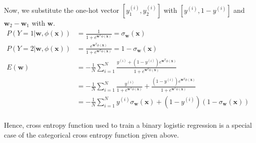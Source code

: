 \documentclass[12pt, fleqn]{article}
\begin{document}
Now, we substitute the one-hot vector $[y_1^{(i)}, y_2^{(i)}]$ with $[y^{(i)}, 1 - y^{(i)}]$ and $\mathbf{w}_2 - \mathbf{w}_1$ with $\mathbf{w}$.
\begin{equation*}
  \begin{aligned}
    P(Y = 1| \mathbf{w}, \phi(\mathbf{x})) & = \frac{1}{1 + e^{\mathbf{w}^T \phi(\mathbf{x})}} = \sigma_\mathbf{w} (\mathbf{x})                                                                                                 \\
    P(Y = 2| \mathbf{w}, \phi(\mathbf{x})) & = \frac{e^{\mathbf{w}^T \phi(\mathbf{x})}}{1 + e^{\mathbf{w}^T \phi(\mathbf{x})}} = 1 - \sigma_\mathbf{w} (\mathbf{x})                                                             \\
    E(\mathbf{w})                          & = - \frac{1}{N} \sum_{i=1}^N \frac{y^{(i)} + (1 - y^{(i)}) e^{\mathbf{w}^T \phi(\mathbf{x})}}{1 + e^{\mathbf{w}^T \phi(\mathbf{x})}}                                               \\
                                           & = - \frac{1}{N} \sum_{i=1}^N \frac{y^{(i)}}{1 + e^{\mathbf{w}^T \phi(\mathbf{x})}} + \frac{(1 - y^{(i)}) e^{\mathbf{w}^T \phi(\mathbf{x})}}{1 + e^{\mathbf{w}^T \phi(\mathbf{x})}} \\
                                           & = - \frac{1}{N} \sum_{i=1}^N y^{(i)} \sigma_\mathbf{w} (\mathbf{x}) + (1 - y^{(i)})(1 - \sigma_\mathbf{w} (\mathbf{x}))                                                            \\
  \end{aligned}
\end{equation*}

Hence, cross entropy function used to train a binary logistic regression is a special case of the categorical cross entropy function given above.
\end{document}

